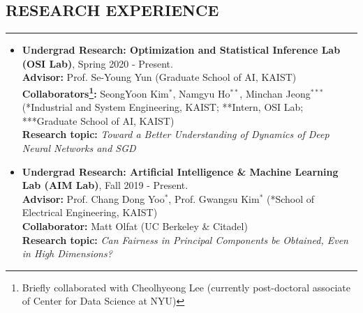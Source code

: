\documentclass[10pt,a4]{article}
\begin{document}
\begin{small}
\pagestyle{fancy}
\lhead{\textcolor{gray}{\it Junghyun Lee}}
\fancyfoot[C]{}



\subsection*{RESEARCH EXPERIENCE}
\hrule
\vspace{0.2cm}
\begin{itemize}
  
 \item 
 	{\bf Undergrad Research: Optimization and Statistical Inference Lab (OSI Lab)}, Spring 2020 - Present. \\
 {\bf Advisor:} Prof. Se-Young Yun (Graduate School of AI, KAIST) \\
 {\bf Collaborators\footnote{Briefly collaborated with Cheolhyeong Lee (currently post-doctoral associate of Center for Data Science at NYU)}:} SeongYoon Kim$^{*}$, Namgyu Ho$^{**}$, Minchan Jeong$^{***}$ (*Industrial and System Engineering, KAIST; **Intern, OSI Lab; ***Graduate School of AI, KAIST) \\
 {\bf Research topic:} {\it Toward a Better Understanding of Dynamics of Deep Neural Networks and SGD } \\


 \item {\bf Undergrad Research:
  Artificial Intelligence \& Machine Learning Lab (AIM Lab)}, Fall 2019 - Present. \\
 {\bf Advisor:} Prof. Chang Dong Yoo$^{*}$, Prof. Gwangsu Kim$^{*}$ (*School of Electrical Engineering, KAIST) \\
 {\bf Collaborator:} Matt Olfat (UC Berkeley \& Citadel) \\
 {\bf Research topic:} {\it Can Fairness in Principal Components be Obtained, Even in High Dimensions?} \\


\end{itemize}
\end{small}
\end{document}
